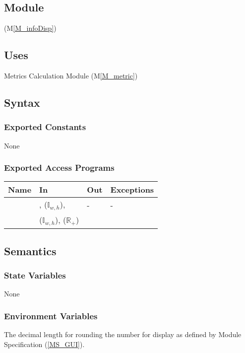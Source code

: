 \documentclass[12pt, titlepage]{article}
\newcommand{\mref}[1]{M\ref{#1}}
\newcommand{\mrefp}[1]{(\mref{#1})}
\newcommand{\mreff}[1]{Module \mrefp{#1}}
\newcommand{\msref}[1]{Module Specification (\ref{#1})}
\begin{document}
\subsection{Module}
 \mrefp{M_infoDisp}

\subsection{Uses}
Metrics Calculation \mreff{M_metric}

\subsection{Syntax}

\subsubsection{Exported Constants}
None

\subsubsection{Exported Access Programs}

\begin{center}
\begin{tabular}{L{3cm} L{5cm} L{3cm} L{3cm}}
\hline
\textbf{Name} & \textbf{In} & \textbf{Out} & \textbf{Exceptions} \\
\hline
{} & ,  ($\mathbb{I}_{w,h}$), & - & - \\
                  &  ($\mathbb{I}_{w,h}$),  ($\mathbb{R}_+$) \\
\hline
\end{tabular}
\end{center}

\subsection{Semantics}

\subsubsection{State Variables}
None

\subsubsection{Environment Variables}
The decimal length for rounding the number for display as defined by \msref{MS_GUI}.
\end{document}

